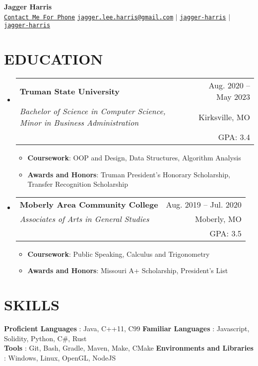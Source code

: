 \documentclass[letterpaper,11pt]{article}
\makeatletter
\newcommand{\resumeItem}[1]{
  \item\small{
    {#1 \vspace{-1pt}}
  }
}
\newcommand{\resumeSubheading}[5]{
  \vspace{-1pt}\item
    \begin{tabular*}{\textwidth}[t]{l@{\extracolsep{\fill}}r}
      \textbf{#1} & {\color{dark-grey}\small #2}\vspace{1pt}\\ %
      \textit{#3} & {\color{dark-grey} \small #4}\vspace{1pt}\\ %
      & \color{dark-grey} \small #5
    \end{tabular*}\vspace{-20pt}
}
\newcommand{\resumeSubHeadingListStart}{\begin{itemize}[leftmargin=0in, label={}]}
\newcommand{\resumeSubHeadingListEnd}{\end{itemize}}
\newcommand{\resumeItemListStart}{\begin{itemize}\setlength{\itemindent}{-1em}}
\newcommand{\resumeItemListEnd}{\end{itemize}\vspace{0pt}}
\makeatother
\begin{document}
\begin{center}
	\textbf{\Huge Jagger Harris} \\ \vspace{5pt}
  \small \faPhone* \texttt{\href{tel:+1555-555-5555}{Contact Me For Phone}} \hspace{1pt}
	\hspace{1pt} \faEnvelope \hspace{2pt} \texttt{\href{mailto:jagger.lee.harris@gmail.com}{jagger.lee.harris@gmail.com}} \hspace{1pt} $|$
	\hspace{1pt} \faGithub \hspace{2pt} \texttt{\href{https://github.com/jagger-harris}{jagger-harris}} \hspace{1pt} $|$
	\hspace{1pt} \faLinkedin \hspace{2pt} \texttt{\href{https://www.linkedin.com/in/jagger-harris/}{jagger-harris}} \hspace{1pt}
	\\ \vspace{-3pt}
\end{center}

\section{EDUCATION}
\resumeSubHeadingListStart

\resumeSubheading
{Truman State University}{Aug. 2020 -- May 2023}
{Bachelor of Science in Computer Science, Minor in Business Administration}{Kirksville, MO}
{GPA: 3.4}
\resumeItemListStart
\resumeItem {\textbf{Coursework}: OOP and Design, Data Structures, Algorithm Analysis}
\resumeItem
{\textbf{Awards and Honors}: Truman President's Honorary Scholarship, Transfer Recognition Scholarship}
\resumeItemListEnd

\resumeSubheading
{Moberly Area Community College}{Aug. 2019 -- Jul. 2020}
{Associates of Arts in General Studies}{Moberly, MO}
{GPA: 3.5}
\resumeItemListStart
\resumeItem {\textbf{Coursework}: Public Speaking, Calculus and Trigonometry}
\resumeItem
{\textbf{Awards and Honors}: Missouri A+ Scholarship, President's List}
\resumeItemListEnd
\resumeSubHeadingListEnd

\section{SKILLS}
\begin{itemize}[leftmargin=0in, label={}]
	\small{\item{
		\textbf{Proficient Languages} {: Java, C++11, C99}\vspace{2pt}
		\hfill
		\textbf{Familiar Languages} {: Javascript, Solidity, Python, C\#, Rust}\vspace{2pt} \\
		\textbf{Tools}     {: Git, Bash, Gradle, Maven, Make, CMake}
    \hfill
    \textbf{Environments and Libraries}     {: Windows, Linux, OpenGL, NodeJS}
	}}
\end{itemize}
\end{document}
